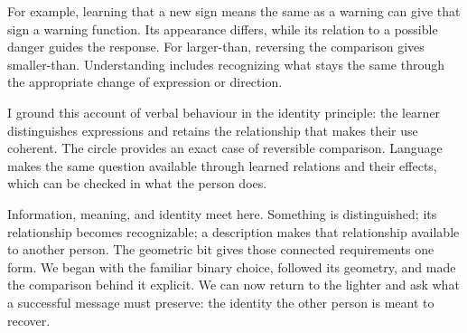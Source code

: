 \documentclass[11pt,a4paper]{article}
\theoremstyle{definition}
\begin{document}
For example, learning that a new sign means the same as a warning
can give that sign a warning function. Its appearance differs,
while its relation to a possible danger guides the response.
For larger-than, reversing the comparison gives smaller-than.
Understanding includes recognizing what stays the same through
the appropriate change of expression or direction.

I ground this account of verbal behaviour in the identity
principle: the learner distinguishes expressions and retains
the relationship that makes their use coherent. The circle
provides an exact case of reversible comparison. Language makes
the same question available through learned relations and their
effects, which can be checked in what the person does.

Information, meaning, and identity meet here. Something is
distinguished; its relationship becomes recognizable; a
description makes that relationship available to another person.
The geometric bit gives those connected requirements one form.
We began with the familiar binary choice, followed its geometry,
and made the comparison behind it explicit. We can now return
to the lighter and ask what a successful message must preserve:
the identity the other person is meant to recover.
\end{document}

